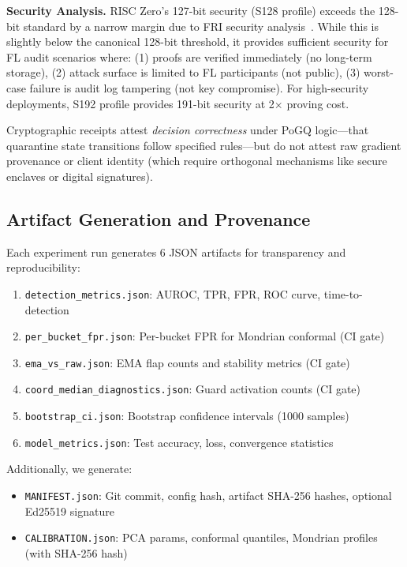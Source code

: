 \textbf{Security Analysis.} RISC Zero's 127-bit security (S128 profile) exceeds the 128-bit standard by a narrow margin due to FRI security analysis~\cite{fri-security}. While this is slightly below the canonical 128-bit threshold, it provides sufficient security for FL audit scenarios where: (1) proofs are verified immediately (no long-term storage), (2) attack surface is limited to FL participants (not public), (3) worst-case failure is audit log tampering (not key compromise). For high-security deployments, S192 profile provides 191-bit security at 2$\times$ proving cost.

Cryptographic receipts attest \textit{decision correctness} under PoGQ logic---that quarantine state transitions follow specified rules---but do not attest raw gradient provenance or client identity (which require orthogonal mechanisms like secure enclaves or digital signatures).


\subsection{Artifact Generation and Provenance}
\label{sec:artifacts}

Each experiment run generates 6 JSON artifacts for transparency and reproducibility:

\begin{enumerate}[leftmargin=*,noitemsep]
    \item \texttt{detection\_metrics.json}: AUROC, TPR, FPR, ROC curve, time-to-detection
    \item \texttt{per\_bucket\_fpr.json}: Per-bucket FPR for Mondrian conformal (CI gate)
    \item \texttt{ema\_vs\_raw.json}: EMA flap counts and stability metrics (CI gate)
    \item \texttt{coord\_median\_diagnostics.json}: Guard activation counts (CI gate)
    \item \texttt{bootstrap\_ci.json}: Bootstrap confidence intervals (1000 samples)
    \item \texttt{model\_metrics.json}: Test accuracy, loss, convergence statistics
\end{enumerate}

Additionally, we generate:
\begin{itemize}[leftmargin=*,noitemsep]
    \item \texttt{MANIFEST.json}: Git commit, config hash, artifact SHA-256 hashes, optional Ed25519 signature
    \item \texttt{CALIBRATION.json}: PCA params, conformal quantiles, Mondrian profiles (with SHA-256 hash)
\end{itemize}

